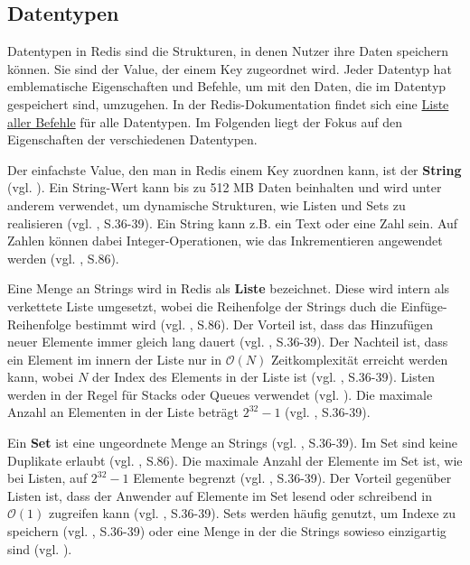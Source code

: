 
\subsection{Datentypen}
\label{subsec:datentypen}

Datentypen in \ac{Redis} sind die Strukturen, in denen Nutzer ihre Daten speichern können. Sie sind der Value, der einem Key zugeordnet wird. Jeder Datentyp hat emblematische Eigenschaften und Befehle, um mit den Daten, die im Datentyp gespeichert sind, umzugehen. In der \ac{Redis}-Dokumentation findet sich eine \href{https://redis.io/commands}{Liste aller Befehle} für alle Datentypen. Im Folgenden liegt der Fokus auf den Eigenschaften der verschiedenen Datentypen. 

Der einfachste Value, den man in \ac{Redis} einem Key zuordnen kann, ist der \textbf{String} (vgl. \cite{Redis-Docs-String}). Ein String-Wert kann bis zu 512 MB Daten beinhalten und wird unter anderem verwendet, um dynamische Strukturen, wie Listen und Sets zu realisieren (vgl. \cite{4}, S.36-39). Ein String kann z.B. ein Text oder eine Zahl sein. Auf Zahlen können dabei Integer-Operationen, wie das Inkrementieren angewendet werden (vgl. \cite{nosql}, S.86).

Eine Menge an Strings wird in \ac{Redis} als \textbf{Liste} bezeichnet. Diese wird intern als verkettete Liste umgesetzt, wobei die Reihenfolge der Strings duch die Einfüge-Reihenfolge bestimmt wird (vgl. \cite{nosql}, S.86). Der Vorteil ist, dass das Hinzufügen neuer Elemente immer gleich lang dauert (vgl. \cite{4}, S.36-39). Der Nachteil ist, dass ein Element im innern der Liste nur in $\mathcal{O}(N)$ Zeitkomplexität erreicht werden kann, wobei $N$ der Index des Elements in der Liste ist (vgl. \cite{4}, S.36-39). Listen werden in der Regel für Stacks oder Queues verwendet (vgl. \cite{Redis-Docs-List}). Die maximale Anzahl an Elementen in der Liste beträgt $2^{32} - 1$ (vgl. \cite{4}, S.36-39).

Ein \textbf{Set} ist eine ungeordnete Menge an Strings (vgl. \cite{4}, S.36-39). Im Set sind keine Duplikate erlaubt (vgl. \cite{nosql}, S.86). Die maximale Anzahl der Elemente im Set ist, wie bei Listen, auf $2^{32} - 1$ Elemente begrenzt (vgl. \cite{4}, S.36-39). Der Vorteil gegenüber Listen ist, dass der Anwender auf Elemente im Set lesend oder schreibend in $\mathcal{O}(1)$ zugreifen kann (vgl. \cite{4}, S.36-39). Sets werden häufig genutzt, um Indexe zu speichern (vgl. \cite{4}, S.36-39) oder eine Menge in der die Strings sowieso einzigartig sind (vgl. \cite{Redis-Docs-Set}).

